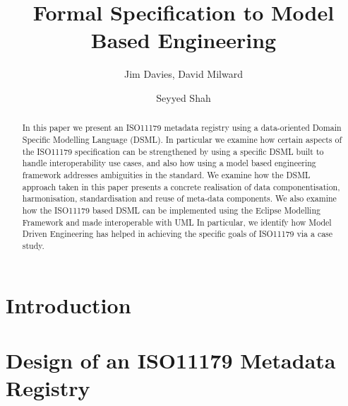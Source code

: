 \documentclass{llncs}
\begin{document}
\title{Formal Specification to Model Based Engineering}

\author{Jim Davies, David Milward \and Seyyed Shah}
\maketitle

\begin{abstract}
In this paper we present an ISO11179 metadata registry using a data-oriented Domain Specific Modelling Language (DSML). In particular we examine how certain aspects of the ISO11179 specification can be strengthened by using a specific DSML built to handle interoperability use cases, and also how using a model based engineering framework addresses ambiguities in the standard. We examine how the DSML approach taken in this paper presents a concrete realisation of data componentisation, harmonisation, standardisation and reuse of meta-data components. We also examine how the ISO11179 based DSML can be implemented using the Eclipse Modelling Framework and made interoperable with UML In particular, we identify how Model Driven Engineering has helped in achieving the specific goals of ISO11179 via a case study.

\end{abstract}

\noindent

\section{Introduction}

\section{Design of an ISO11179 Metadata Registry}
\end{document}
